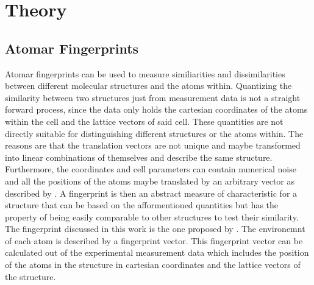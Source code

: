 
\chapter{Theory} %

\label{Chapter1} %


\newcommand{\keyword}[1]{\textbf{#1}}
\newcommand{\tabhead}[1]{\textbf{#1}}
\newcommand{\code}[1]{\texttt{#1}}
\newcommand{\file}[1]{\texttt{\bfseries#1}}
\newcommand{\option}[1]{\texttt{\itshape#1}}


\section{Atomar Fingerprints}
Atomar fingerprints can be used to measure similiarities and dissimilarities between different molecular structures and the atoms within. Quantizing the similarity between two structures just from measurement data is not a straight forward process, since the data only holds the cartesian coordinates of the atoms within the cell and the lattice vectors of said cell. These  quantities are not directly suitable for distinguishing different structures or the atoms within. The reasons are that the translation vectors are not unique and maybe transformed into linear combinations of themselves and describe the same structure. Furthermore, the coordinates and cell parameters can contain numerical noise and all the positions of the atoms maybe translated by an arbitrary vector as described by \citeauthor{Lonie2012} \cite{Lonie2012}. A fingerprint is then an abstract measure of characteristic for a structure that can be based on the afformentioned quantities but has the property of being easily comparable to other structures to test their similarity. The fingerprint discussed in this work is the one proposed by \citeauthor{Zhu2016} \cite{Zhu2016}. The environemnt of each atom is described by a fingerprint vector. This fingerprint vector can be calculated out of the experimental measurement data which includes the position of the atoms in the structure in cartesian coordinates and the lattice vectors of the structure. \\
